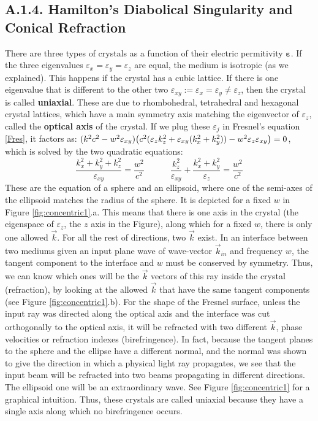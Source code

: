 \documentclass[11pt, a4paper, twoside]{article} %
\begin{document}
\subsection*{A.1.4. Hamilton's Diabolical Singularity and Conical Refraction\vspace{-0.2cm}}
There are three types of crystals as a function of their electric permitivity $\pmb{\varepsilon}$. If the three eigenvalues $\varepsilon_x=\varepsilon_y=\varepsilon_z$ are equal, the medium is isotropic (as we explained). This happens if the crystal has a cubic lattice. If there is one eigenvalue that is different to the other two $\varepsilon_{xy}:=\varepsilon_x=\varepsilon_y\neq \varepsilon_z$, then the crystal is called {\bf uniaxial}. These are due to rhombohedral, tetrahedral and hexagonal crystal lattices, which have a main symmetry axis matching the eigenvector of $\varepsilon_z$, called the {\bf optical axis} of the crystal. If we plug these $\varepsilon_j$ in Fresnel's equation \eqref{Fres}, it factors as: $(k^2c^2-w^2\varepsilon_{xy})\qty(c^2(\varepsilon_zk_z^2+\varepsilon_{xy}(k_x^2+k_y^2))-w^2\varepsilon_z\varepsilon_{xy})=0$, which is solved by the two quadratic equations:
\begin{equation}
\frac{k_x^2+k_y^2+k_z^2}{\varepsilon_{xy}}=\frac{w^2}{c^2} \quad \quad \quad \frac{k_z^2}{\varepsilon_{xy}}+\frac{k_x^2+k_y^2}{\varepsilon_z}=\frac{w^2}{c^2}
\end{equation}
These are the equation of a sphere and an ellipsoid, where one of the semi-axes of the ellipsoid matches the radius of the sphere. It is depicted for a fixed $w$ in Figure \ref{fig:concentric1}.a. This means that there is one axis in the crystal (the eigenspace of $\varepsilon_z$, the $z$ axis in the Figure), along which for a fixed $w$, there is only one allowed $\vec{k}$. For all the rest of directions, two $\vec{k}$ exist. In an interface between two mediums given an input plane wave of wave-vector $\vec{k}_{in}$ and frequency $w$, the tangent component to the interface and $w$ must be conserved by symmetry. Thus, we can know which ones will be the $\vec{k}$ vectors of this ray inside the crystal (refraction), by looking at the allowed $\vec{k}$ that have the same tangent components (see Figure \ref{fig:concentric1}.b). For the shape of the Fresnel surface, unless the input ray was directed along the optical axis and the interface was cut orthogonally to the optical axis, it will be refracted with two different $\vec{k}$, phase velocities or refraction indexes (birefringence). In fact, because the tangent planes to the sphere and the ellipse have a different normal, and the normal was shown to give the direction in which a physical light ray propagates, we see that the input beam will be refracted into two beams propagating in different directions. The ellipsoid one will be an extraordinary wave. See Figure \ref{fig:concentric1} for a graphical intuition. Thus, these crystals are called uniaxial because they have a single axis along which no birefringence occurs.
\end{document}
